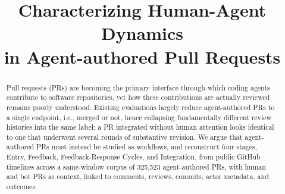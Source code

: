\documentclass[10pt,conference,anonymous]{IEEEtran}
\begin{document}
\title{
Characterizing Human-Agent Dynamics \\in Agent-authored Pull Requests
}
\author{}
\maketitle
\begin{abstract}
Pull requests (PRs) are becoming the primary interface through which coding agents contribute to software repositories, yet how these contributions are actually reviewed remains poorly understood.
Existing evaluations largely reduce agent-authored PRs to a single endpoint, i.e., merged or not, hence collapsing fundamentally different review histories into the same label: a PR integrated without human attention looks identical to one that underwent several rounds of substantive revision. We argue that agent-authored PRs must instead be studied as workflows, and reconstruct four stages, Entry, Feedback, Feedback-Response Cycles, and Integration, from public GitHub timelines across a same-window corpus of 325,523 agent-authored PRs, with human and bot PRs as context, linked to comments, reviews, commits, actor metadata, and outcomes.

\end{abstract}
\end{document}
